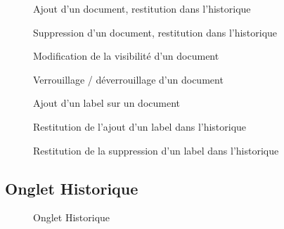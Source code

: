 \begin{figure}[H]
  \centering
  \caption{Ajout d'un document, restitution dans l'historique}
  \label{fig:ajout-document-hist}
\end{figure}

\begin{figure}[H]
  \centering
  \caption{Suppression d'un document, restitution dans l'historique}
  \label{fig:suppr-document-hist}
\end{figure}

\begin{figure}[H]
  \centering
  \caption{Modification de la visibilité d'un document}
  \label{fig:visibilite-document-hist}
\end{figure}

\begin{figure}[H]
  \centering
  \caption{Verrouillage / déverrouillage d'un document}
  \label{fig:verrou-document-hist}
\end{figure}

\begin{figure}[H]
  \centering
  \caption{Ajout d'un label sur un document}
  \label{fig:ajout-label}
\end{figure}

\begin{figure}[H]
  \centering
  \caption{Restitution de l'ajout d'un label dans l'historique}
  \label{fig:ajout-label-hist}
\end{figure}

\begin{figure}[H]
  \centering
  \caption{Restitution de la suppression d'un label dans l'historique}
  \label{fig:suppr-label-hist}
\end{figure}

\subsection{Onglet Historique}

\begin{figure}[H]
  \centering
  \caption{Onglet Historique}
  \label{fig:onglet-historique}
\end{figure}

